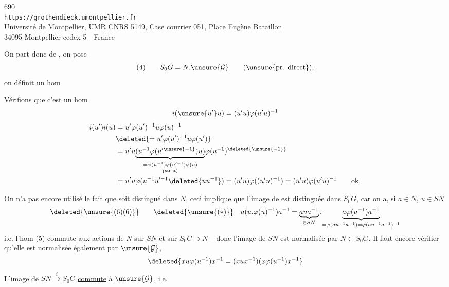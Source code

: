 
\begin{center}
690\\
\texttt{https://grothendieck.umontpellier.fr}\\
Université de Montpellier, UMR CNRS 5149, Case courrier 051, Place Eugène Bataillon\\
34095 Montpellier cedex 5 - France
\end{center}



On part donc de , on pose
\[
 (4)\qquad S_0G=N.\unsure{\mathcal G}\qquad(\text{\unsure{pr. direct}}),
\]
on définit un hom


Vérifions que c'est un hom
\[
 i(\unsure{u'}u)=(u'u)\varphi(u'u)^{-1}
\]
\[
\begin{aligned}
 i(u')i(u)&=u'\varphi(u')^{-1}u\varphi(u)^{-1}\\
 &\deleted{=u'\varphi(u')^{-1}u\varphi(u')}\\
 &=u'u\underset{\substack{=\varphi(u^{-1})\varphi(u'^{-1})\varphi(u)\\\text{par a)}}}{\underbrace{(u^{-1}\varphi(u'^{\unsure{-1}})u)}}\varphi(u^{-1})^{\deleted{\unsure{-1}}}\\
 &=u'u\varphi(u^{-1}u'^{-1}\deleted{uu^{-1}})=(u'u)\varphi((u'u)^{-1})=(u'u)\varphi(u'u)^{-1}\qquad\text{ok.}
\end{aligned}
\]

On n'a pas encore utilisé le fait que soit distingué dans $N$,  ceci implique que l'image de  est distinguée dans $S_0G$, car  on a, si $a\in N$, $u\in SN$
\[
 \deleted{\unsure{(6)(6)}}\qquad\deleted{\unsure{(*)}}\quad
 a(u.\varphi(u)^{-1})a^{-1}
 =\underbrace{aua^{-1}}_{\in SN}.\underset{=\varphi(au^{-1}a^{-1})=\varphi(au^{-1}a^{-1})^{-1}}{\underbrace{a\varphi(u^{-1})a^{-1}}}
\]
i.e. l'hom (5)  commute aux actions de $N$ sur $SN$ et sur $S_0G\supset N$ -- donc l'image de $SN$ est normalisée par $N\subset S_0G$. Il faut encore vérifier qu'elle est normalisée également par $\unsure{\mathcal G}$, 
\[
 \deleted{xu\varphi(u^{-1})x^{-1}=(xux^{-1})(x\varphi(u^{-1})x^{-1}}
\]
L'image de $SN\xrightarrow{i}S_0G$ \uline{commute} à $\unsure{\mathcal G}$, i.e.

